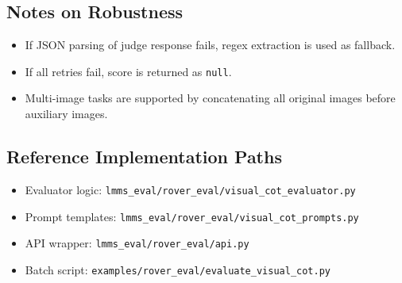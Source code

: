 \documentclass{article}
\theoremstyle{plain}
\theoremstyle{definition}
\theoremstyle{remark}
\begin{document}
\subsection{Notes on Robustness}
\begin{itemize}
\item If JSON parsing of judge response fails, regex extraction is used as fallback.
\item If all retries fail, score is returned as \texttt{null}.
\item Multi-image tasks are supported by concatenating all original images before auxiliary images.
\end{itemize}

\subsection{Reference Implementation Paths}
\begin{itemize}
\item Evaluator logic: \texttt{lmms\_eval/rover\_eval/visual\_cot\_evaluator.py}
\item Prompt templates: \texttt{lmms\_eval/rover\_eval/visual\_cot\_prompts.py}
\item API wrapper: \texttt{lmms\_eval/rover\_eval/api.py}
\item Batch script: \texttt{examples/rover\_eval/evaluate\_visual\_cot.py}
\end{itemize}
\end{document}
